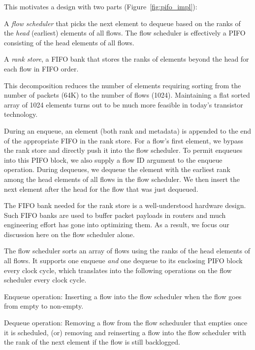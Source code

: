 This motivates a design with two parts (Figure~\ref{fig:pifo_impl}):
\begin{CompactEnumerate}
\item A {\em flow scheduler} that picks the next element to dequeue based on
the ranks of the {\em head} (earliest) elements of all flows. The flow
scheduler is effectively a PIFO consisting of the head elements of all flows.
\item A {\em rank store}, a FIFO bank that stores the ranks of elements beyond
the head for each flow in FIFO order.
\end{CompactEnumerate}

This decomposition reduces the number of elements requiring sorting from the
number of packets (64K) to the number of flows (1024). Maintaining a flat
sorted array of 1024 elements turns out to be much more feasible in today's
transistor technology.

During an enqueue, an element (both rank and metadata) is appended to the end
of the appropriate FIFO in the rank store. For a flow's first element, we
bypass the rank store and directly push it into the flow scheduler. To permit
enqueues into this PIFO block, we also supply a flow ID argument to the enqueue
operation. During dequeues, we dequeue the element with the earliest rank among
the head elements of all flows in the flow scheduler.  We then insert the next
element after the head for the flow that was just dequeued.

The FIFO bank needed for the rank store is a well-understood hardware design.
Such FIFO banks are used to buffer packet payloads in routers and much
engineering effort has gone into optimizing them.  As a result, we focus our
discussion here on the flow scheduler alone.

The flow scheduler sorts an array of flows using the ranks of the head elements
of all flows. It supports one enqueue {\em and} one dequeue to its enclosing
PIFO block every clock cycle, which translates into the following operations on
the flow scheduler every clock cycle.
\begin{CompactEnumerate}
  \item Enqueue operation: Inserting a flow into the flow scheduler 
  when the flow goes from empty to non-empty.
\item Dequeue operation: Removing a flow from the flow scheduuler that
  empties once it is scheduled, (or) removing and reinserting a flow into
  the flow scheduler with the rank of the
  next element if the flow is still backlogged.
\end{CompactEnumerate}

